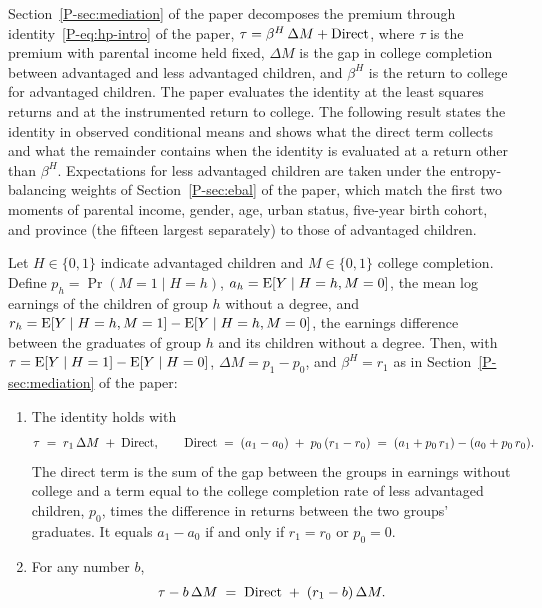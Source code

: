Section~\ref{P-sec:mediation} of the paper decomposes the premium through identity~\eqref{P-eq:hp-intro} of the paper, $\tau = \beta^{H}\,\Delta M + \mathrm{Direct}$, where $\tau$ is the premium with parental income held fixed, $\Delta M$ is the gap in college completion between advantaged and less advantaged children, and $\beta^{H}$ is the return to college for advantaged children. The paper evaluates the identity at the least squares returns and at the instrumented return to college. The following result states the identity in observed conditional means and shows what the direct term collects and what the remainder contains when the identity is evaluated at a return other than $\beta^{H}$.
Expectations for less advantaged children are taken under the entropy-balancing
weights of Section~\ref{P-sec:ebal} of the paper, which match the first
two moments of parental income, gender, age, urban status, five-year birth cohort, and province (the fifteen largest separately) to those of advantaged children.

\begin{proposition}
\label{fr:prop:identity}
Let $H \in \{0,1\}$ indicate advantaged children and $M \in \{0,1\}$ college
completion. Define $p_h = \Pr(M = 1 \mid H = h)$,
$a_h = \mathrm{E}[Y \mid H = h, M = 0]$, the mean log earnings of the children of
group $h$ without a degree, and
$r_h = \mathrm{E}[Y \mid H = h, M = 1] - \mathrm{E}[Y \mid H = h, M = 0]$, the earnings
difference between the graduates of group $h$ and its children without a
degree. Then, with $\tau = \mathrm{E}[Y \mid H = 1] - \mathrm{E}[Y \mid H = 0]$,
$\Delta M = p_1 - p_0$, and $\beta^{H} = r_1$ as in
Section~\ref{P-sec:mediation} of the paper:
\begin{enumerate}
\item[(i)] The identity holds with
\begin{equation}
\tau \;=\; r_1\,\Delta M \;+\; \mathrm{Direct}, \qquad
\mathrm{Direct} \;=\; (a_1 - a_0) \;+\; p_0\,(r_1 - r_0)
\;=\; (a_1 + p_0\,r_1) - (a_0 + p_0\,r_0) .
\label{fr:eq:identity}
\end{equation}
The direct term is the sum of the gap between the groups in earnings
without college and a term equal to the college completion rate of less advantaged children, $p_0$, times the difference in returns between the two groups' graduates. It equals $a_1 - a_0$ if and only if $r_1 = r_0$ or
$p_0 = 0$.
\item[(ii)] For any number $b$,
\begin{equation}
\tau - b\,\Delta M \;=\; \mathrm{Direct} \;+\; (r_1 - b)\,\Delta M .
\label{fr:eq:remainder}
\end{equation}
\end{enumerate}
\end{proposition}

